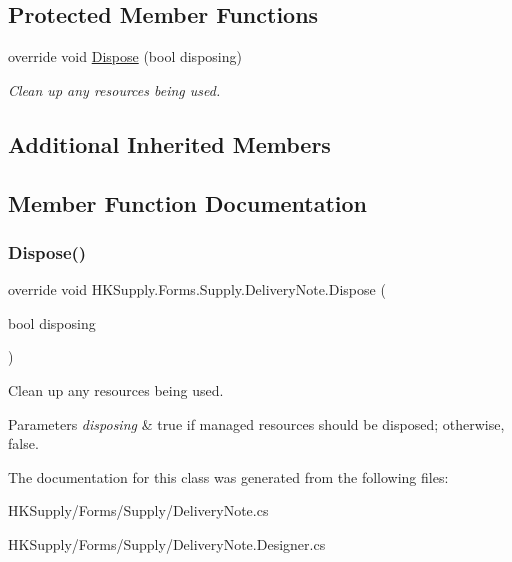 \subsection*{Protected Member Functions}
\begin{DoxyCompactItemize}
\item 
override void \mbox{\hyperlink{class_h_k_supply_1_1_forms_1_1_supply_1_1_delivery_note_ae9c596cbb77a158cc38f56625bd76b06}{Dispose}} (bool disposing)
\begin{DoxyCompactList}\small\item\em Clean up any resources being used. \end{DoxyCompactList}\end{DoxyCompactItemize}
\subsection*{Additional Inherited Members}


\subsection{Member Function Documentation}
\mbox{\label{class_h_k_supply_1_1_forms_1_1_supply_1_1_delivery_note_ae9c596cbb77a158cc38f56625bd76b06}} 
\subsubsection{\texorpdfstring{Dispose()}{Dispose()}}
{\footnotesize\ttfamily override void H\+K\+Supply.\+Forms.\+Supply.\+Delivery\+Note.\+Dispose (\begin{DoxyParamCaption}\item[{bool}]{disposing }\end{DoxyParamCaption})\hspace{0.3cm}{\ttfamily [protected]}}



Clean up any resources being used. 


\begin{DoxyParams}{Parameters}
{\em disposing} & true if managed resources should be disposed; otherwise, false.\\
\hline
\end{DoxyParams}


The documentation for this class was generated from the following files\+:\begin{DoxyCompactItemize}
\item 
H\+K\+Supply/\+Forms/\+Supply/Delivery\+Note.\+cs\item 
H\+K\+Supply/\+Forms/\+Supply/Delivery\+Note.\+Designer.\+cs\end{DoxyCompactItemize}
